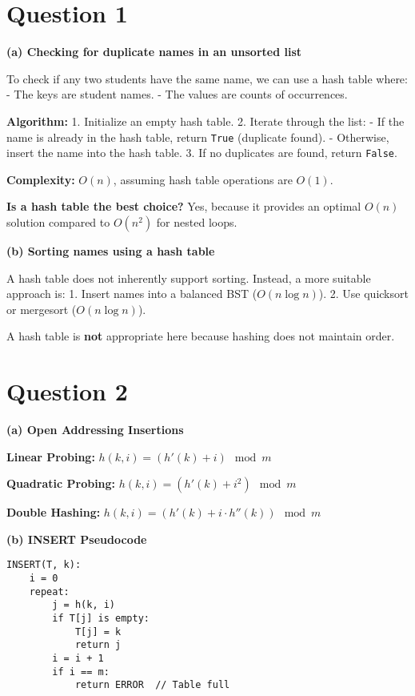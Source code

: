 \documentclass[12pt]{article}
\begin{document}
\renewcommand{\familydefault}{\rmdefault}



\pagebreak
\normalsize

\section*{Question 1}
\textbf{(a) Checking for duplicate names in an unsorted list}

To check if any two students have the same name, we can use a hash table where:
- The keys are student names.
- The values are counts of occurrences.

\textbf{Algorithm:}
1. Initialize an empty hash table.
2. Iterate through the list:
    - If the name is already in the hash table, return \texttt{True} (duplicate found).
    - Otherwise, insert the name into the hash table.
3. If no duplicates are found, return \texttt{False}.

\textbf{Complexity:} \(O(n)\), assuming hash table operations are \(O(1)\).

\textbf{Is a hash table the best choice?} Yes, because it provides an optimal \(O(n)\) solution compared to \(O(n^2)\) for nested loops.

\textbf{(b) Sorting names using a hash table}

A hash table does not inherently support sorting. Instead, a more suitable approach is:
1. Insert names into a balanced BST (\(O(n \log n)\)).
2. Use quicksort or mergesort (\(O(n \log n)\)).

A hash table is \textbf{not} appropriate here because hashing does not maintain order.

\pagebreak
\section*{Question 2}
\textbf{(a) Open Addressing Insertions}

\textbf{Linear Probing:} \(h(k, i) = (h'(k) + i) \mod m\)

\textbf{Quadratic Probing:} \(h(k, i) = (h'(k) + i^2) \mod m\)

\textbf{Double Hashing:} \(h(k, i) = (h'(k) + i \cdot h''(k)) \mod m\)

\textbf{(b) INSERT Pseudocode}
\begin{lstlisting}
INSERT(T, k):
    i = 0
    repeat:
        j = h(k, i)
        if T[j] is empty:
            T[j] = k
            return j
        i = i + 1
        if i == m:
            return ERROR  // Table full
\end{lstlisting}
\end{document}
